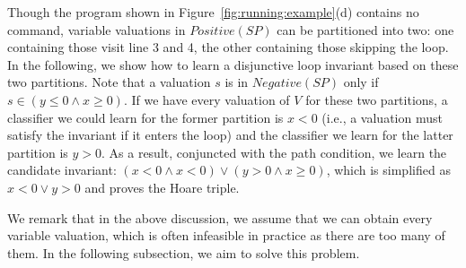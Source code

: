 \begin{example}
Though the program shown in Figure~\ref{fig:running:example}(d) contains no  command, variable valuations in $Positive(SP)$ can be partitioned into two: one containing those visit line 3 and 4, the other containing those skipping the loop. %
In the following, we show how to learn a disjunctive loop invariant based on these two partitions. Note that a valuation $s$ is in $Negative(SP)$ only if $s \in (y\leq 0 \land x \geq 0)$. If we have every valuation of $V$ for these two partitions, a classifier we could learn for the former partition is $x < 0$ (i.e., a valuation must satisfy the invariant if it enters the loop) and the classifier we learn for the latter partition is $y > 0$. As a result, conjuncted with the path condition, we learn the candidate invariant: $(x < 0 \land x < 0) \lor (y > 0 \land x \geq 0)$, which is simplified as $x < 0 \lor y > 0$ and proves the Hoare triple.

We remark that in the above discussion, we assume that we can obtain every variable valuation, which is often infeasible in practice as there are too many of them. In the following subsection, we aim to solve this problem.
\end{example}

